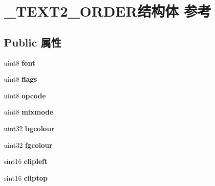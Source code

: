 \hypertarget{struct___t_e_x_t2___o_r_d_e_r}{}\section{\+\_\+\+T\+E\+X\+T2\+\_\+\+O\+R\+D\+E\+R结构体 参考}
\label{struct___t_e_x_t2___o_r_d_e_r}
\subsection*{Public 属性}
\begin{DoxyCompactItemize}
\item 
\mbox{\label{struct___t_e_x_t2___o_r_d_e_r_ae75bbb5bf549d07377e968b4b2c51c19}} 
uint8 {\bfseries font}
\item 
\mbox{\label{struct___t_e_x_t2___o_r_d_e_r_a0b23970158abe37086360035c012bd47}} 
uint8 {\bfseries flags}
\item 
\mbox{\label{struct___t_e_x_t2___o_r_d_e_r_ac67b1faab371b869a1061d964066649a}} 
uint8 {\bfseries opcode}
\item 
\mbox{\label{struct___t_e_x_t2___o_r_d_e_r_a35a6defdcb97158fa7a1d6d590a7a9cc}} 
uint8 {\bfseries mixmode}
\item 
\mbox{\label{struct___t_e_x_t2___o_r_d_e_r_a4109bc50acd38f2c0ed18633031f8b13}} 
uint32 {\bfseries bgcolour}
\item 
\mbox{\label{struct___t_e_x_t2___o_r_d_e_r_a7e18a00c32f812ea963f40ce7009019c}} 
uint32 {\bfseries fgcolour}
\item 
\mbox{\label{struct___t_e_x_t2___o_r_d_e_r_a4d4551494e6882911d8b7c1d3e5e08af}} 
sint16 {\bfseries clipleft}
\item 
\mbox{\label{struct___t_e_x_t2___o_r_d_e_r_a1390136db46a0175f7cfbf4fbd8d3316}} 
sint16 {\bfseries cliptop}
\item 
\mbox{\label{struct___t_e_x_t2___o_r_d_e_r_aa86516202b0e4851bf8a08b07208d02d}} 

\end{DoxyCompactItemize}
